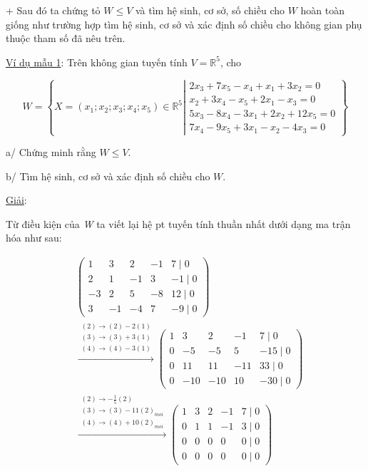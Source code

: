 \documentclass[12pt,a4paper]{article}
\newcommand{\ul}[1]{\uline{#1}}
\begin{document}
+ Sau đó ta chứng tỏ $W \le V$
và tìm hệ sinh, cơ sở, số chiều cho
$W$ hoàn toàn giống như
trường hợp tìm hệ sinh, cơ sở và xác định số chiều cho không gian phụ
thuộc tham số đã nêu trên.

\ul{Ví dụ mẫu 1}: Trên không gian tuyến tính
$V = \mathbb{R}^5$, cho

\[W = \left\{ X = (x_1; x_2; x_3; x_4; x_5) \in \mathbb{R}^5 \left| \begin{matrix} 2x_3 + 7x_5 - x_4 + x_1 + 3x_2 = 0 \\ x_2 + 3x_4 - x_5 + 2x_1 - x_3 = 0 \\ 5x_3 - 8x_4 - 3x_1 + 2x_2 + 12x_5 = 0 \\ 7x_4 - 9x_5 + 3x_1 - x_2 - 4x_3 = 0 \end{matrix} \right. \right\}\]

a/ Chứng minh rằng $W \le V$.

b/ Tìm hệ sinh, cơ sở và xác định số chiều cho
$W$.

\ul{Giải}:

Từ điều kiện của \emph{W} ta viết lại hệ pt tuyến tính thuần nhất dưới
dạng ma trận hóa như sau:

\begin{align*}
&\begin{pmatrix} 1 & 3 & 2 & -1 & 7 \mid 0 \\ 2 & 1 & -1 & 3 & -1 \mid 0 \\ -3 & 2 & 5 & -8 & 12 \mid 0 \\ 3 & -1 & -4 & 7 & -9 \mid 0 \end{pmatrix} \\
&\xrightarrow{\substack{(2) \to (2) - 2(1) \\ (3) \to (3) + 3(1) \\ (4) \to (4) - 3(1)}}
\begin{pmatrix} 1 & 3 & 2 & -1 & 7 \mid 0 \\ 0 & -5 & -5 & 5 & -15 \mid 0 \\ 0 & 11 & 11 & -11 & 33 \mid 0 \\ 0 & -10 & -10 & 10 & -30 \mid 0 \end{pmatrix} \\
&\xrightarrow{\substack{(2) \to -\frac{1}{5}(2) \\ (3) \to (3) - 11(2)_{moi} \\ (4) \to (4) + 10(2)_{moi}}}
\begin{pmatrix} 1 & 3 & 2 & -1 & 7 \mid 0 \\ 0 & 1 & 1 & -1 & 3 \mid 0 \\ 0 & 0 & 0 & 0 & 0 \mid 0 \\ 0 & 0 & 0 & 0 & 0 \mid 0 \end{pmatrix}
\end{align*}
\end{document}
